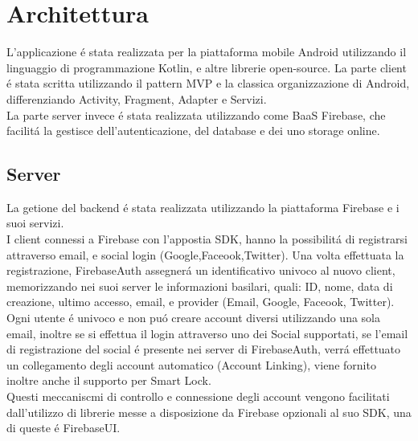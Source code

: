 \chapter{Architettura}                %
\lhead[\fancyplain{}{\bfseries\thepage}]{\fancyplain{}{\bfseries\rightmark}}


L'applicazione \'e stata realizzata per la piattaforma mobile Android utilizzando il linguaggio di programmazione Kotlin, e altre librerie open-source. La parte client \'e stata scritta utilizzando il pattern MVP e la classica organizzazione di Android, differenziando Activity, Fragment, Adapter e Servizi.\\
La parte server invece \'e stata realizzata utilizzando come BaaS Firebase, che facilit\'a la gestisce dell'autenticazione, del database e dei uno storage online.\\

\newpage






\section{Server}                 %
La getione del backend \'e stata realizzata utilizzando la piattaforma Firebase e i suoi servizi.\\
I client connessi a Firebase con l'appostia SDK, hanno la possibilit\'a di registrarsi attraverso email, e social login (Google,Faceook,Twitter). Una volta effettuata la registrazione, FirebaseAuth assegner\'a un identificativo univoco al nuovo client, memorizzando nei suoi server le informazioni basilari, quali: ID, nome, data di creazione, ultimo accesso, email, e provider (Email, Google, Faceook, Twitter).\\
Ogni utente \'e univoco e non pu\'o creare account diversi utilizzando una sola email, inoltre se si effettua il login attraverso uno dei Social supportati, se l'email di registrazione del social \'e presente nei server di FirebaseAuth, verr\'a effettuato un collegamento degli account automatico (Account Linking), viene fornito inoltre anche il supporto per Smart Lock.\\
Questi meccaniscmi di controllo e connessione degli account vengono facilitati dall'utilizzo di librerie messe a disposizione da Firebase opzionali al suo SDK, una di queste \'e FirebaseUI.\@

